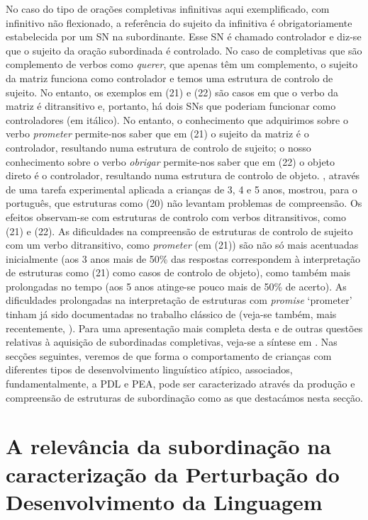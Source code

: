 \documentclass[output=paper,colorlinks,citecolor=brown,booklanguage=portuguese]{langscibook}
\begin{document}
No caso do tipo de orações completivas infinitivas aqui exemplificado, com infinitivo não flexionado, a referência do sujeito da infinitiva é obrigatoriamente estabelecida por um SN na subordinante. Esse SN é chamado controlador e diz-se que o sujeito da oração subordinada é controlado. No caso de completivas que são complemento de verbos como \emph{querer}, que apenas têm um complemento, o sujeito da matriz funciona como controlador e temos uma estrutura de controlo de sujeito. No entanto, os exemplos em (21) e (22) são casos em que o verbo da matriz é ditransitivo e, portanto, há dois SNs que poderiam funcionar como controladores (em itálico). No entanto, o conhecimento que adquirimos sobre o verbo \emph{prometer} permite-nos saber que em (21) o sujeito da matriz é o controlador, resultando numa estrutura de controlo de sujeito; o nosso conhecimento sobre o verbo \emph{obrigar} permite-nos saber que em (22) o objeto direto é o controlador, resultando numa estrutura de controlo de objeto. \citet{Agostinho2014}, através de uma tarefa experimental aplicada a crianças de 3, 4 e 5 anos, mostrou, para o português, que estruturas como (20) não levantam problemas de compreensão. Os efeitos observam-se com estruturas de controlo com verbos ditransitivos, como (21) e (22).  As dificuldades na compreensão de estruturas de controlo de sujeito com um verbo ditransitivo, como \emph{prometer} (em (21)) são não só mais acentuadas inicialmente (aos 3 anos mais de 50\% das respostas correspondem à interpretação de estruturas como (21) como casos de controlo de objeto), como também mais prolongadas no tempo (aos 5 anos atinge-se pouco mais de 50\% de acerto). As dificuldades prolongadas na interpretação de estruturas com \emph{promise} ‘prometer’ tinham já sido documentadas no trabalho clássico de \citet{Chomsky1969} (veja-se também, mais recentemente, \citealp{Mateu2016}). Para uma apresentação mais completa desta e de outras questões relativas à aquisição de subordinadas completivas, veja-se a síntese em \citet{Santos2017a, Santos2021}. Nas secções seguintes, veremos de que forma o comportamento de crianças com diferentes tipos de desenvolvimento linguístico atípico, associados, fundamentalmente, a PDL e PEA, pode ser caracterizado através da produção e compreensão de estruturas de subordinação como as que destacámos nesta secção.

\section{A relevância da subordinação na caracterização da Perturbação do Desenvolvimento da Linguagem}
\end{document}
